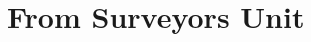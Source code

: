 \hypertarget{group___e_g_x_math-_conversions-_length_conversions-_surveyors}{}\section{From Surveyors Unit}
\label{group___e_g_x_math-_conversions-_length_conversions-_surveyors}
